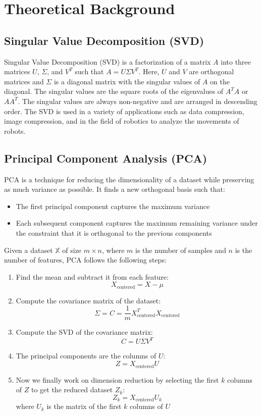 \documentclass[11pt]{amsart}
\begin{document}
\section{Theoretical Background}\label{sec:theory}

\subsection{Singular Value Decomposition (SVD)}

Singular Value Decomposition (SVD) is a factorization of a matrix $A$ into three matrices $U$, $\Sigma$, and $V^T$ such that $A = U\Sigma V^T$. Here, $U$ and $V$ are orthogonal matrices and $\Sigma$ is a diagonal matrix with the singular values of $A$ on the diagonal. The singular values are the square roots of the eigenvalues of $A^TA$ or $AA^T$. The singular values are always non-negative and are arranged in descending order. The SVD is used in a variety of applications such as data compression, image compression, and in the field of robotics to analyze the movements of robots.

\subsection{Principal Component Analysis (PCA)}

PCA is a technique for reducing the dimensionality of a dataset while preserving as much variance as possible. It finds a new orthogonal basis such that:

\begin{itemize}
    \item The first principal component captures the maximum variance
    \item Each subsequent component captures the maximum remaining variance under the constraint that it is orthogonal to the previous components
\end{itemize}

Given a dataset $\mathbb{X}$ of size $m \times n$, where $m$ is the number of samples and $n$ is the number of features, PCA follows the following steps:

\begin{enumerate}
    \item Find the mean and subtract it from each feature: \[X_{\text{centered}} = X - \mu\]
    \item Compute the covariance matrix of the dataset:
    \[\Sigma = C = \frac{1}{m}X^T_{\text{centered}}X_{\text{centered}}\]
    \item Compute the SVD of the covariance matrix: \[C = U\Sigma V^T\]
    \item The principal components are the columns of $U$:
    \[Z = X_{\text{centered}}U\]
    \item Now we finally work on dimension reduction by selecting the first $k$ columns of $Z$ to get the reduced dataset $Z_k$: \[Z_k = X_{\text{centered}}U_k\] where $U_k$ is the matrix of the first $k$ columns of $U$
\end{enumerate}
\end{document}
